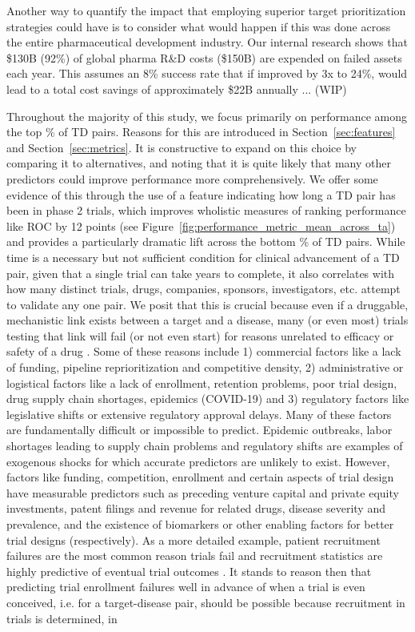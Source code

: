 \documentclass{article}
\begin{document}
Another way to quantify the impact that employing superior target prioritization strategies could have is to consider what would happen if this was done across the entire pharmaceutical development industry. Our internal research shows that \$130B (92\%) of global pharma R\&D costs (\$150B) are expended on failed assets each year. This assumes an 8\% success rate that if improved by 3x to 24\%, would lead to a total cost savings of approximately \$22B annually ... (WIP)

Throughout the majority of this study, we focus primarily on performance among the top \topRankingPct\% of TD pairs. Reasons for this are introduced in Section~\ref{sec:features} and Section~\ref{sec:metrics}. It is constructive to expand on this choice by comparing it to alternatives, and noting that it is quite likely that many other predictors could improve performance more comprehensively. We offer some evidence of this through the use of a feature indicating how long a TD pair has been in phase 2 trials, which improves wholistic measures of ranking performance like ROC by 12 points (see Figure~\ref{fig:performance_metric_mean_across_ta}) and provides a particularly dramatic lift across the bottom \bottomRankingPct\% of TD pairs. While time is a necessary but not sufficient condition for clinical advancement of a TD pair, given that a single trial can take years to complete, it also correlates with how many distinct trials, drugs, companies, sponsors, investigators, etc. attempt to validate any one pair. We posit that this is crucial because even if a druggable, mechanistic link exists between a target and a disease, many (or even most) trials testing that link will fail (or not even start) for reasons unrelated to efficacy or safety of a drug \cite{Razuvayevskaya2023.02.07.23285407}. Some of these reasons include 1) commercial factors like a lack of funding, pipeline reprioritization and competitive density, 2) administrative or logistical factors like a lack of enrollment, retention problems, poor trial design, drug supply chain shortages, epidemics (COVID-19) and 3) regulatory factors like legislative shifts or extensive regulatory approval delays. Many of these factors are fundamentally difficult or impossible to predict. Epidemic outbreaks, labor shortages leading to supply chain problems and regulatory shifts are examples of exogenous shocks for which accurate predictors are unlikely to exist. However, factors like funding, competition, enrollment and certain aspects of trial design have measurable predictors such as preceding venture capital and private equity investments, patent filings and revenue for related drugs, disease severity and prevalence, and the existence of biomarkers or other enabling factors for better trial designs (respectively). As a more detailed example, patient recruitment failures are the most common reason trials fail \cite{Razuvayevskaya2023.02.07.23285407} and recruitment statistics are highly predictive of eventual trial outcomes \cite{Lo2019Machine,PMID:34430930}. It stands to reason then that predicting trial enrollment failures well in advance of when a trial is even conceived, i.e. for a target-disease pair, should be possible because recruitment in trials is determined, in 
\end{document}
